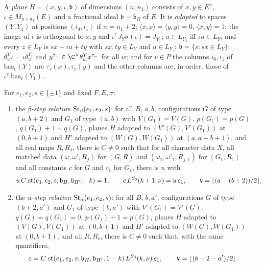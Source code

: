 \begin{definition}\label{pf:thmK:def:steps}
A \emph{plane} $H=(x,y,\iota,\mathfrak b)$ of dimensions $(n,n_1)$ consists of $x,y\in E^n$,
$\iota\in M_{n\times n_1}(E)$ and a fractional ideal $\mathfrak b=\mathfrak b_H$ of $E$. It is \emph{adapted} to spaces
$(Y,Y_1)$ at positions $(i_0,i_1)$ if $n=n_1+2$; $\langle x,x\rangle=\langle y,y\rangle=0$, $\langle x,y\rangle=1$; the
image of $\iota$ is orthogonal to $x,y$ and $\iota^{\mathsf T}J_Y\sigma(\iota)=J_{Y_1}$; $u\in L_{Y_1}$ iff $\iota u\in
L_Y$, and every $z\in L_Y$ is $sx+\iota u+ty$ with $sx,ty\in L_Y$ and $u\in L_{Y_1}$; $\mathfrak b=\{s:sx\in L_Y\}$;
$\theta^Y_w\iota=\iota\theta^{Y_1}_w$ and $y^{\tau_w}\in\C^\times\theta^Y_wx^{\tau_w}$ for all $w$; and for $v\in P$ the
columns $i_0,i_1$ of $\mathrm{bas}_v(Y)$ are $\tau_v(x),\tau_v(y)$ and the other columns are, in order, those of
$\iota^{\tau_v}\mathrm{bas}_v(Y_1)$.

For $e_1,e_2,s\in\{\pm1\}$ and fixed $F,E,\sigma$:
\begin{enumerate}
\item the \emph{$\beta$-step relation} $\operatorname{St}_\beta(e_1,e_2,s)$: for all $B$, $a,b$, configurations $G$ of type
$(a,b+2)$ and $G_1$ of type $(a,b)$ with $V(G_1)=V(G)$, $p(G_1)=p(G)$, $q(G_1)+1=q(G)$, planes $H$ adapted to
$(V'(G),V'(G_1))$ at $(0,b+1)$ and $H'$ adapted to $(W(G),W(G_1))$ at $(a,a+b+1)$, and all real maps $R,R_1$, there is
$C\ne0$ such that for all character data $X$, all matched data $(\omega,\omega',R_f)$ for $(G,R)$ and
$(\omega_1,\omega'_1,R_{f,1})$ for $(G_1,R_1)$ and all constants $c$ for $G$ and $c_1$ for $G_1$, there is $u$ with
\begin{equation}\label{pf:thmK:eq:stepbeta}
u\,C\,\operatorname{st}(e_1,e_2,s;\mathfrak b_H,\mathfrak b_{H'};-k)=1,\qquad c\,L^{S_0}(k+1,\nu)=u\,c_1,\qquad
k=\lfloor(a-(b+2))/2\rfloor;
\end{equation}
\item the \emph{$\alpha$-step relation} $\operatorname{St}_\alpha(e_1,e_2,s)$: for all $B$, $b,a'$, configurations $G$ of type
$(b+2,a')$ and $G_1$ of type $(b,a')$ with $V'(G_1)=V'(G)$, $q(G)=q(G_1)=0$, $p(G_1)+1=p(G)$, planes $H$ adapted to
$(V(G),V(G_1))$ at $(0,b+1)$ and $H'$ adapted to $(W(G),W(G_1))$ at $(0,b+1)$, and all $R,R_1$, there is $C\ne0$ such
that, with the same quantifiers,
\begin{equation}\label{pf:thmK:eq:stepalpha}
c=C\,\operatorname{st}(e_1,e_2,s;\mathfrak b_H,\mathfrak b_{H'};1-k)\,L^{S_0}(k,\nu)\,c_1,\qquad k=\lfloor(b+2-a')/2\rfloor.
\end{equation}
\end{enumerate}
\end{definition}

